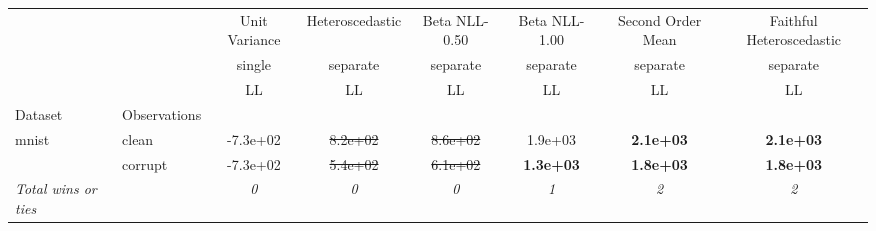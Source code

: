 \begin{tabular}{ll|c|c|c|c|c|c}
\toprule
{} & {} & {Unit Variance} & {Heteroscedastic} & {Beta NLL-0.50} & {Beta NLL-1.00} & {Second Order Mean} & {Faithful Heteroscedastic} \\
{} & {} & {single} & {separate} & {separate} & {separate} & {separate} & {separate} \\
{} & {} & {LL} & {LL} & {LL} & {LL} & {LL} & {LL} \\
{Dataset} & {Observations} & {} & {} & {} & {} & {} & {} \\
\midrule
\multirow[t]{2}{*}{mnist} & clean & -7.3e+02 & \sout{8.2e+02} & \sout{8.6e+02} & 1.9e+03 & \textbf{2.1e+03} & \textbf{2.1e+03} \\
 & corrupt & -7.3e+02 & \sout{5.4e+02} & \sout{6.1e+02} & \textbf{1.3e+03} & \textbf{1.8e+03} & \textbf{1.8e+03} \\
\textit{{Total wins or ties}} &  & \textit{0} & \textit{0} & \textit{0} & \textit{1} & \textit{2} & \textit{2} \\
\bottomrule
\end{tabular}
